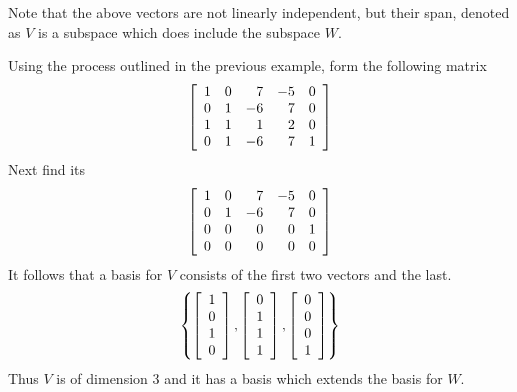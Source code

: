 \begin{solution}
Note that the above vectors are not linearly independent, but their span,
denoted as $V$ is a subspace which does include the subspace $W$. 

Using the process outlined in the previous example, form the following matrix 
\begin{equation*}
\left[
\begin{array}{rrrrr}
1 & 0 & 7 & -5 & 0 \\ 
0 & 1 & -6 & 7 & 0 \\ 
1 & 1 & 1 & 2 & 0 \\ 
0 & 1 & -6 & 7 & 1
\end{array}
\right]
\end{equation*}
Next find its {\rref}
\begin{equation*}
\left[
\begin{array}{rrrrr}
1 & 0 & 7 & -5 & 0 \\ 
0 & 1 & -6 & 7 & 0 \\ 
0 & 0 & 0 & 0 & 1 \\ 
0 & 0 & 0 & 0 & 0
\end{array}
\right]
\end{equation*}
It follows that a basis for $V$ consists of the first two vectors and the
last. 
\begin{equation*}
\left\{ \left[
\begin{array}{c}
1 \\ 
0 \\ 
1 \\ 
0
\end{array}
\right] ,\left[ 
\begin{array}{c}
0 \\ 
1 \\ 
1 \\ 
1
\end{array}
\right] ,\left[ 
\begin{array}{c}
0 \\ 
0 \\ 
0 \\ 
1
\end{array}
\right] \right\}
\end{equation*}
Thus $V$ is of dimension 3 and it has a basis which extends the basis for $W$.
\end{solution}
